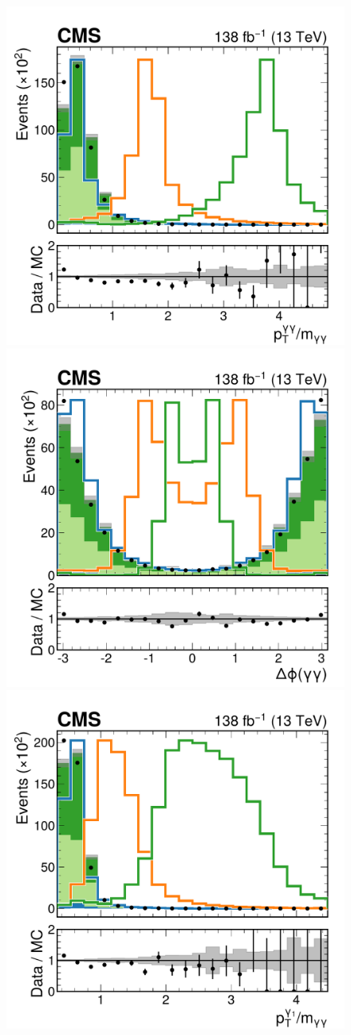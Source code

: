 \begin{figure}
    \centering
    \includegraphics[width=.49\linewidth]{Figures/Dihiggs/categorisation/input_features/Graviton/Scale_equal/Diphoton_pt_mgg_GluGluToBulkGravitonToHHTo2G2Tau_M-1000_linear.pdf}
    \includegraphics[width=.49\linewidth]{Figures/Dihiggs/categorisation/input_features/Graviton/Scale_equal/Diphoton_dPhi_GluGluToBulkGravitonToHHTo2G2Tau_M-1000_linear.pdf} \\
    \includegraphics[width=.49\linewidth]{Figures/Dihiggs/categorisation/input_features/Graviton/Scale_equal/LeadPhoton_pt_mgg_GluGluToBulkGravitonToHHTo2G2Tau_M-1000_linear.pdf}

\end{figure}

